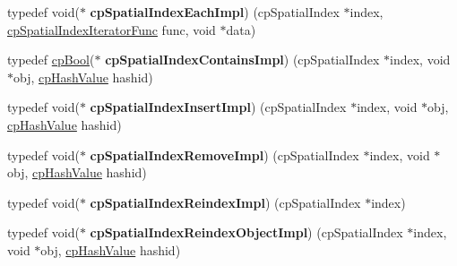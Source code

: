 \begin{DoxyCompactItemize}
\item 
\hypertarget{group__cp_spatial_index_ga7c2c2ed1234f45f8b3e50cb79d23f882}{}typedef void($\ast$ {\bfseries cp\+Spatial\+Index\+Each\+Impl}) (cp\+Spatial\+Index $\ast$index, \hyperlink{group__cp_spatial_index_ga522e250b59a1802d3648085685d41f97}{cp\+Spatial\+Index\+Iterator\+Func} func, void $\ast$data)\label{group__cp_spatial_index_ga7c2c2ed1234f45f8b3e50cb79d23f882}

\item 
\hypertarget{group__cp_spatial_index_gad729c7d8dd9cd247b35727fc2aa2bc84}{}typedef \hyperlink{group__basic_types_gabc5e752c48f3449ca26ef413ecbd647e}{cp\+Bool}($\ast$ {\bfseries cp\+Spatial\+Index\+Contains\+Impl}) (cp\+Spatial\+Index $\ast$index, void $\ast$obj, \hyperlink{group__basic_types_gae7eb4775a9f43914a15553ca65a048f4}{cp\+Hash\+Value} hashid)\label{group__cp_spatial_index_gad729c7d8dd9cd247b35727fc2aa2bc84}

\item 
\hypertarget{group__cp_spatial_index_gab1a1e7d307a79fc97d47189bb0aea8a9}{}typedef void($\ast$ {\bfseries cp\+Spatial\+Index\+Insert\+Impl}) (cp\+Spatial\+Index $\ast$index, void $\ast$obj, \hyperlink{group__basic_types_gae7eb4775a9f43914a15553ca65a048f4}{cp\+Hash\+Value} hashid)\label{group__cp_spatial_index_gab1a1e7d307a79fc97d47189bb0aea8a9}

\item 
\hypertarget{group__cp_spatial_index_gaf943dffbd088c1f4809a254b0eb96860}{}typedef void($\ast$ {\bfseries cp\+Spatial\+Index\+Remove\+Impl}) (cp\+Spatial\+Index $\ast$index, void $\ast$obj, \hyperlink{group__basic_types_gae7eb4775a9f43914a15553ca65a048f4}{cp\+Hash\+Value} hashid)\label{group__cp_spatial_index_gaf943dffbd088c1f4809a254b0eb96860}

\item 
\hypertarget{group__cp_spatial_index_gae8c6986404106d1b4717ef0a24463fe2}{}typedef void($\ast$ {\bfseries cp\+Spatial\+Index\+Reindex\+Impl}) (cp\+Spatial\+Index $\ast$index)\label{group__cp_spatial_index_gae8c6986404106d1b4717ef0a24463fe2}

\item 
\hypertarget{group__cp_spatial_index_ga5109ec90ae7c99cf421d1b233db63900}{}typedef void($\ast$ {\bfseries cp\+Spatial\+Index\+Reindex\+Object\+Impl}) (cp\+Spatial\+Index $\ast$index, void $\ast$obj, \hyperlink{group__basic_types_gae7eb4775a9f43914a15553ca65a048f4}{cp\+Hash\+Value} hashid)\label{group__cp_spatial_index_ga5109ec90ae7c99cf421d1b233db63900}


\end{DoxyCompactItemize}
